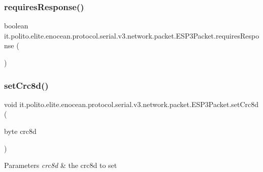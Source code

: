 \subsubsection{\texorpdfstring{requires\+Response()}{requiresResponse()}}
{\footnotesize\ttfamily boolean it.\+polito.\+elite.\+enocean.\+protocol.\+serial.\+v3.\+network.\+packet.\+E\+S\+P3\+Packet.\+requires\+Response (\begin{DoxyParamCaption}{ }\end{DoxyParamCaption})}

\hypertarget{classit_1_1polito_1_1elite_1_1enocean_1_1protocol_1_1serial_1_1v3_1_1network_1_1packet_1_1_e_s_p3_packet_a7f4a14dbde798cc50d7a280205bea7b4}{}\label{classit_1_1polito_1_1elite_1_1enocean_1_1protocol_1_1serial_1_1v3_1_1network_1_1packet_1_1_e_s_p3_packet_a7f4a14dbde798cc50d7a280205bea7b4} 
\subsubsection{\texorpdfstring{set\+Crc8d()}{setCrc8d()}}
{\footnotesize\ttfamily void it.\+polito.\+elite.\+enocean.\+protocol.\+serial.\+v3.\+network.\+packet.\+E\+S\+P3\+Packet.\+set\+Crc8d (\begin{DoxyParamCaption}\item[{byte}]{crc8d }\end{DoxyParamCaption})}


\begin{DoxyParams}{Parameters}
{\em crc8d} & the crc8d to set \\
\hline
\end{DoxyParams}
\hypertarget{classit_1_1polito_1_1elite_1_1enocean_1_1protocol_1_1serial_1_1v3_1_1network_1_1packet_1_1_e_s_p3_packet_ae3b414d6f73f6c62d589e2c9f96537d8}{}\label{classit_1_1polito_1_1elite_1_1enocean_1_1protocol_1_1serial_1_1v3_1_1network_1_1packet_1_1_e_s_p3_packet_ae3b414d6f73f6c62d589e2c9f96537d8} 
